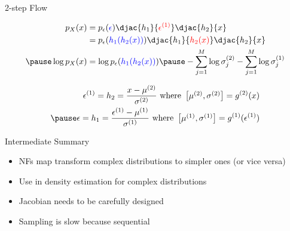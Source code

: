 \documentclass[14pt]{beamer}
\begin{document}
\begin{frame}{2-step Flow}
\begin{small}
\begin{equation*}
\begin{aligned}
p_{X}(x) &= p_{\epsilon}(\textcolor{blue}{\epsilon})\djac{h_{1}}{\textcolor{red}{\epsilon^{(1)}}}\djac{h_{2}}{x} \\
&= p_{\epsilon}(\textcolor{blue}{h_{1}(h_{2}(x))})\djac{h_{1}}{\textcolor{red}{h_{2}(x)}}\djac{h_{2}}{x} \\ \pause
\log p_{X}(x) &= \log p_{\epsilon}(\textcolor{blue}{h_{1}(h_{2}(x))})\pause -\sum_{j=1}^{M}\log\sigma^{(2)}_{j}-\sum_{j=1}^{M}\log\sigma^{(1)}_{j}
\end{aligned}
\end{equation*}
\end{small}
\pause
\begin{equation*}
\begin{aligned}
\epsilon^{(1)} = h_{2} = \frac{x - \mu^{(2)}}{\sigma^{(2)}} \text{ where } \begin{bmatrix}\mu^{(2)}, \sigma^{(2)}\end{bmatrix} = g^{(2)}(x) \\ \pause
\epsilon = h_{1} = \frac{\epsilon^{(1)} - \mu^{(1)}}{\sigma^{(1)}} \text{ where } \begin{bmatrix}\mu^{(1)}, \sigma^{(1)}\end{bmatrix} = g^{(1)}(\epsilon^{(1)})
\end{aligned}
\end{equation*}
\end{frame}

\begin{frame}{Intermediate Summary}
\begin{itemize}
\item NFs map transform complex distributions to simpler ones (or vice versa)
\item Use in density estimation for complex distributions
\item Jacobian needs to be carefully designed
\item Sampling is slow because sequential
\end{itemize}
\end{frame}
\end{document}
